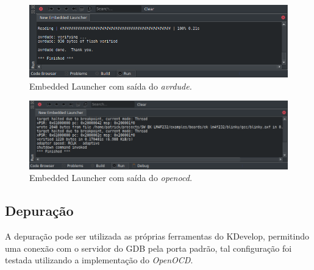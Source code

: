 \begin{figure}[!htb]
  \centering
  \caption[\textit{Embedded Launcher} com \textit{avrdude}]{Embedded Launcher com saída do \textit{avrdude.}}
  \label{fig:runavrdude}
  \includegraphics[width=1\textwidth]{figuras/runavrdude.png}
\end{figure}

\begin{figure}[!htb]
  \centering
  \caption[\textit{Embedded Launcher} com \textit{openocd}]{Embedded Launcher com saída do \textit{openocd.}}
  \label{fig:runopenocd}
  \includegraphics[width=1\textwidth]{figuras/runopenocd.png}
\end{figure}

\subsection{Depuração}

A depuração pode ser utilizada as próprias ferramentas do KDevelop, permitindo uma conexão com o servidor do GDB pela porta padrão, tal configuração foi testada utilizando a implementação do \textit{OpenOCD}.

